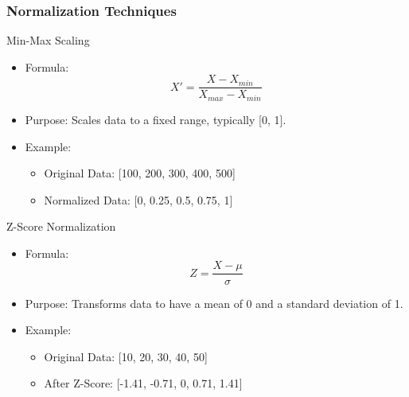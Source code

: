 \documentclass[aspectratio=169]{beamer}
\begin{document}
\begin{frame}[fragile]
    \frametitle{Normalization Techniques}
    \begin{block}{Min-Max Scaling}
        \begin{itemize}
            \item Formula: 
            \[
            X' = \frac{X - X_{min}}{X_{max} - X_{min}}
            \]
            \item Purpose: Scales data to a fixed range, typically [0, 1].
            \item Example:
            \begin{itemize}
                \item Original Data: [100, 200, 300, 400, 500]
                \item Normalized Data: [0, 0.25, 0.5, 0.75, 1]
            \end{itemize}
        \end{itemize}
    \end{block}
    \begin{block}{Z-Score Normalization}
        \begin{itemize}
            \item Formula: 
            \[
            Z = \frac{X - \mu}{\sigma}
            \]
            \item Purpose: Transforms data to have a mean of 0 and a standard deviation of 1.
            \item Example:
            \begin{itemize}
                \item Original Data: [10, 20, 30, 40, 50]
                \item After Z-Score: [-1.41, -0.71, 0, 0.71, 1.41]
            \end{itemize}
        \end{itemize}
    \end{block}
\end{frame}
\end{document}
